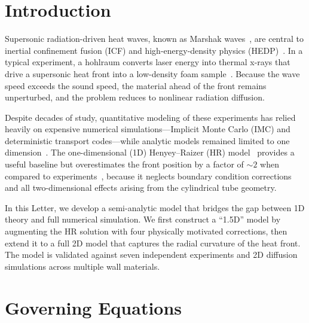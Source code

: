 \documentclass[prl, twocolumn, superscriptaddress, amsmath, amssymb, reprint]{revtex4-2}
\begin{document}
\maketitle

\section{Introduction}

Supersonic radiation-driven heat waves, known as Marshak waves~\cite{Marshak1958, Zel'dovich1967}, are central to inertial confinement fusion (ICF) and high-energy-density physics (HEDP)~\cite{Lindl2004}.
In a typical experiment, a hohlraum converts laser energy into thermal x-rays that drive a supersonic heat front into a low-density foam sample~\cite{Back2000PRL, Back2000POP, Moore2015}.
Because the wave speed exceeds the sound speed, the material ahead of the front remains unperturbed, and the problem reduces to nonlinear radiation diffusion.

Despite decades of study, quantitative modeling of these experiments has relied heavily on expensive numerical simulations---Implicit Monte Carlo (IMC) and deterministic transport codes---while analytic models remained limited to one dimension~\cite{Henyey1955, Hammer2003, Shussman2015}.
The one-dimensional (1D) Henyey--Raizer (HR) model~\cite{Henyey1955} provides a useful baseline but overestimates the front position by a factor of $\sim 2$ when compared to experiments~\cite{Back2000POP}, because it neglects boundary condition corrections and all two-dimensional effects arising from the cylindrical tube geometry.

In this Letter, we develop a semi-analytic model that bridges the gap between 1D theory and full numerical simulation.
We first construct a ``1.5D'' model by augmenting the HR solution with four physically motivated corrections, then extend it to a full 2D model that captures the radial curvature of the heat front.
The model is validated against seven independent experiments and 2D diffusion simulations across multiple wall materials.

\section{Governing Equations}
\end{document}
